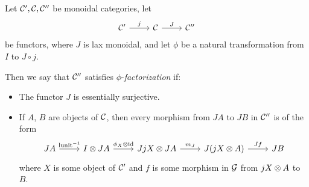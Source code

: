 \documentclass{article}
\begin{document}
\begin{definition}[Factorization]
  Let ${\mathcal{C}}', {\mathcal{C}}, {\mathcal{C}}''$ be monoidal categories, let
  \[
    \begin{tikzcd}
      \C' \arrow[r, "j"]
        & \C \arrow[r, "J"]
          & \C''
    \end{tikzcd}
    \]
  be functors, where $J$ is lax monoidal, and let $\phi$ be a natural transformation from $I$ to $J\circ j$.

  Then we say that ${\mathcal{C}}''$ satisfies $\phi$-\emph{factorization} if:
  \begin{itemize}
    \item The functor $J$ is essentially surjective.  
    \item If $A$, $B$ are objects of ${\mathcal{C}}$, then every morphism from $JA$ to $JB$ in ${\mathcal{C}}''$ is of the form
      \[
        \begin{tikzcd}
          JA \arrow[r, "\lunit\inv"]
            & I \tensor JA \arrow[r, "\phi_X \tensor \id"]
              & JjX \tensor JA \arrow[r, "m_J"]
                & J(jX \tensor A) \arrow[r, "Jf"]
                  & JB
        \end{tikzcd}
        \]
      where $X$ is some object of ${\mathcal{C}}'$ and $f$ is some morphism in $\mathcal G$ from $jX\otimes A$ to $B$.
  \end{itemize}
\end{definition}
\end{document}
